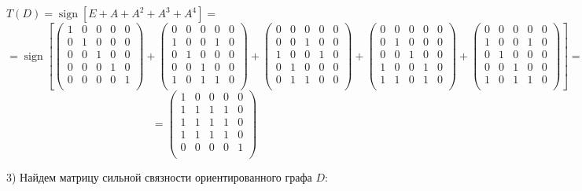 \documentclass[fleqn]{article}
\DeclareMathOperator{\sign}{sign}
\begin{document}
$T(D)= \sign{[E + A + A^2 + A^3 + A^4]}=$
$$=\sign\left[\begin{pmatrix}
1 & 0 & 0 & 0 & 0\\
0 & 1 & 0 & 0 & 0\\
0 & 0 & 1 & 0 & 0\\
0 & 0 & 0 & 1 & 0\\
0 & 0 & 0 & 0 & 1\\
\end{pmatrix}
+
\begin{pmatrix}
0 & 0 & 0 & 0 & 0\\
1 & 0 & 0 & 1 & 0\\
0 & 1 & 0 & 0 & 0\\
0 & 0 & 1 & 0 & 0\\
1 & 0 & 1 & 1 & 0\\
\end{pmatrix}
+
\begin{pmatrix}
0 & 0 & 0 & 0 & 0\\
0 & 0 & 1 & 0 & 0\\
1 & 0 & 0 & 1 & 0\\
0 & 1 & 0 & 0 & 0\\
0 & 1 & 1 & 0 & 0\\
\end{pmatrix}
+
\begin{pmatrix}
0 & 0 & 0 & 0 & 0\\
0 & 1 & 0 & 0 & 0\\
0 & 0 & 1 & 0 & 0\\
1 & 0 & 0 & 1 & 0\\
1 & 1 & 0 & 1 & 0\\
\end{pmatrix}
+
\begin{pmatrix}
0 & 0 & 0 & 0 & 0\\
1 & 0 & 0 & 1 & 0\\
0 & 1 & 0 & 0 & 0\\
0 & 0 & 1 & 0 & 0\\
1 & 0 & 1 & 1 & 0\\
\end{pmatrix}\right]
=$$
$$=\begin{pmatrix}
1 & 0 & 0 & 0 & 0\\
1 & 1 & 1 & 1 & 0\\
1 & 1 & 1 & 1 & 0\\
1 & 1 & 1 & 1 & 0\\
0 & 0 & 0 & 0 & 1\\
\end{pmatrix}
$$

3) Найдем матрицу сильной связности ориентированного графа $D$:
\end{document}
